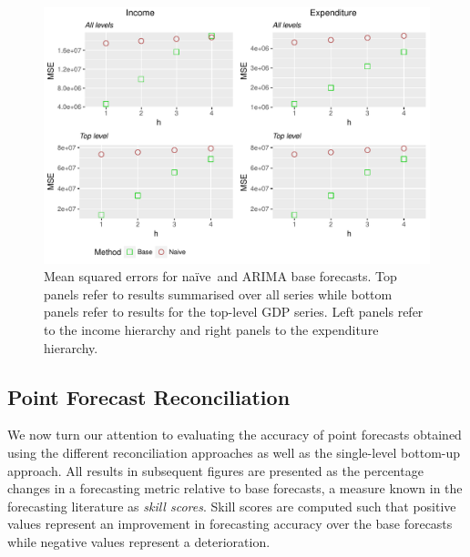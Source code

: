 \documentclass[a4paper, 11pt]{article}
\def\naive{na\"{i}ve\ }
\begin{document}
\begin{figure}
	\centering
	\small
	\includegraphics[width=\textwidth]{Figs/Results/NaiveVsBase_MSE.pdf}
	\caption{Mean squared errors for \naive and ARIMA base forecasts. Top panels refer to results summarised over all series while bottom panels refer to results for the top-level GDP series. Left panels refer to the income hierarchy and right panels to the expenditure hierarchy.}\label{fig: NaiveVsBase_MSE}
\end{figure}

\subsection{Point Forecast Reconciliation}

We now turn our attention to evaluating the accuracy of point forecasts obtained using the different reconciliation approaches as well as the single-level bottom-up approach. All results in subsequent figures are presented as the percentage changes in a forecasting metric relative to base forecasts, a measure known in the forecasting literature as \emph{skill scores}. Skill scores are computed such that positive values represent an improvement in forecasting accuracy over the base forecasts while negative values represent a deterioration.
\end{document}
